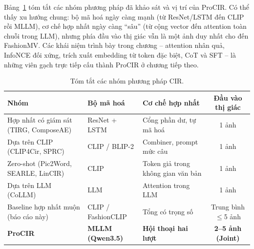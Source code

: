Bảng~\ref{tab:method-groups} tóm tắt các nhóm phương pháp đã khảo sát và vị trí của ProCIR. Có thể thấy xu hướng chung: bộ mã hoá ngày càng mạnh (từ ResNet/LSTM đến CLIP rồi MLLM), cơ chế hợp nhất ngày càng ``sâu'' (từ cộng vector đến attention toàn chuỗi trong LLM), nhưng phía đầu vào thị giác vẫn là một ảnh duy nhất cho đến FashionMV. Các khái niệm trình bày trong chương -- attention nhân quả, InfoNCE đối xứng, trích xuất embedding từ token đặc biệt, CoT và SFT -- là những viên gạch trực tiếp cấu thành ProCIR ở chương tiếp theo.

\begin{table}[h]
\centering
\caption{Tóm tắt các nhóm phương pháp CIR.}
\label{tab:method-groups}
\small
\begin{tabular}{p{3.0cm}p{3.2cm}p{3.6cm}c}
\toprule
Nhóm & Bộ mã hoá & Cơ chế hợp nhất & Đầu vào thị giác \\
\midrule
Hợp nhất có giám sát (TIRG, ComposeAE) & ResNet + LSTM & Cổng phần dư, tự mã hoá & 1 ảnh \\
Dựa trên CLIP (CLIP4Cir, SPRC) & CLIP / BLIP-2 & Combiner, prompt mức câu & 1 ảnh \\
Zero-shot (Pic2Word, SEARLE, LinCIR) & CLIP & Token giả trong không gian văn bản & 1 ảnh \\
Dựa trên LLM (CoLLM) & LLM & Attention trong LLM & 1 ảnh \\
Baseline hợp nhất muộn (báo cáo này) & CLIP / FashionCLIP & Tổng có trọng số & Trung bình $\le$5 ảnh \\
\textbf{ProCIR} & \textbf{MLLM (Qwen3.5)} & \textbf{Hội thoại hai lượt} & \textbf{2--5 ảnh (Joint)} \\
\bottomrule
\end{tabular}
\end{table}
